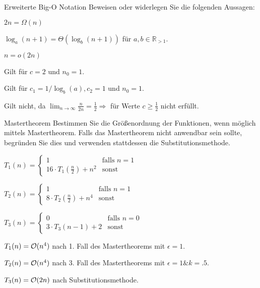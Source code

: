 \documentclass{exercisesheet}
\begin{document}
\begin{eexercises}{Erweiterte Big-O Notation}{
    Beweisen oder widerlegen Sie die folgenden Aussagen:
  }
  \item $2n = \Omega(n)$
  \item $\log_a(n+1) = \Theta(\log_b(n+1))$ für $a,b \in \mathbb{R}_{>1}$.
  \item $n = o(2n)$
\end{eexercises}

\begin{solutions}
  \item Gilt für $c = 2$ und $n_0 = 1$.
  \item Gilt für $c_1=1/\log_b(a), c_2=1$ und $n_0 = 1$.
  \item Gilt nicht, da $\lim_{n\to\infty} \frac{n}{2n} = \frac{1}{2} \Rightarrow $ für Werte $c\geq\frac{1}{2}$ nicht erfüllt.
\end{solutions}

\begin{eexercises}{Mastertheorem}{
    Bestimmen Sie die Größenordnung der Funktionen, wenn möglich mittels Mastertheorem. Falls das Mastertheorem nicht anwendbar sein sollte, begründen Sie dies und verwenden stattdessen die Substitutionsmethode.
  }
  \item $T_1(n) = \begin{cases}
      1                               & \text{falls } n = 1 \\
      16 \cdot T_1(\frac{n}{2}) + n^2 & \text{sonst}
    \end{cases}$
  \item $T_2(n) = \begin{cases}
      1                              & \text{falls } n = 1 \\
      8 \cdot T_2(\frac{n}{2}) + n^4 & \text{sonst}
    \end{cases}$
  \item $T_3(n) = \begin{cases}
      0                    & \text{falls } n = 0 \\
      3 \cdot T_3(n-1) + 2 & \text{sonst}
    \end{cases}$
\end{eexercises}

\begin{solutions}
  \item $T_1(n) = \mathcal{O}(n^4)$ nach 1. Fall des Mastertheorems mit $\epsilon=1$.
  \item $T_2(n) = \mathcal{O}(n^4)$ nach 3. Fall des Mastertheorems mit $\epsilon=1 \& k=.5$.
  \item $T_3(n) = \mathcal{O}(2n)$ nach Substitutionsmethode.
\end{solutions}
\end{document}
